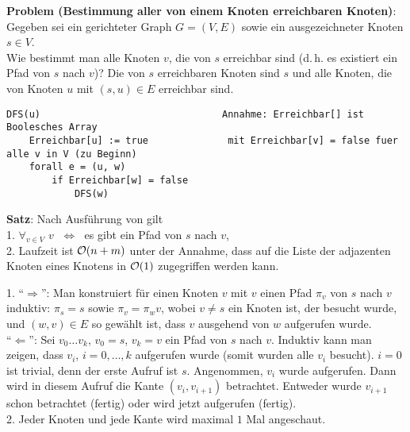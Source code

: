 \textbf{Problem (Bestimmung aller von einem Knoten erreichbaren Knoten)}: \\
Gegeben sei ein gerichteter Graph $G = (V, E)$ sowie ein ausgezeichneter Knoten
$s \in V$. \\
Wie bestimmt man alle Knoten $v$, die von $s$ erreichbar sind
(d.\,h. es existiert ein Pfad von $s$ nach $v$)?
Die von $s$ erreichbaren Knoten sind $s$ und alle Knoten, die von
Knoten $u$ mit $(s, u) \in E$ erreichbar sind.

\begin{lstlisting}
DFS(u)                                Annahme: Erreichbar[] ist Boolesches Array
    Erreichbar[u] := true              mit Erreichbar[v] = false fuer alle v in V (zu Beginn)
    forall e = (u, w)
        if Erreichbar[w] = false
            DFS(w)
\end{lstlisting}

\textbf{Satz}: Nach Ausführung von  gilt \\
1. $\forall_{v \in V}$ \code{Erreichbar[}$v$\code{] = true}
$\;\Leftrightarrow\;$ es gibt ein Pfad von $s$ nach $v$, \\
2. Laufzeit ist $\mathcal{O}(n + m)$ unter der Annahme, dass auf die Liste der
adjazenten Knoten eines Knotens in $\mathcal{O}(1)$ zugegriffen werden kann.

\begin{Beweis}
    1. "`$\Rightarrow$"':
    Man konstruiert für einen Knoten $v$ mit
    \code{Erreichbar[}$v$\code{] = true}
    einen Pfad $\pi_v$ von $s$ nach $v$ induktiv:
    $\pi_s = s$ sowie $\pi_v = \pi_w v$, wobei $v \not= s$ ein Knoten ist,
    der besucht wurde, und $(w, v) \in E$ so gewählt ist, dass
    $v$\code{)} ausgehend von $w$\code{)} aufgerufen
    wurde. \\
    "`$\Leftarrow$"':
    Sei $v_0 \dotsc v_k$, $v_0 = s$, $v_k = v$ ein Pfad von $s$ nach $v$.
    Induktiv kann man zeigen, dass $v_i$\code{)}, $i = 0, \dotsc, k$
    aufgerufen wurde (somit wurden alle $v_i$ besucht).
    $i = 0$ ist trivial, denn der erste Aufruf ist $s$\code{)}.
    Angenommen, $v_i$\code{)} wurde aufgerufen.
    Dann wird in diesem Aufruf die Kante $(v_i, v_{i+1})$ betrachtet.
    Entweder wurde $v_{i+1}$ schon betrachtet (fertig) oder wird jetzt
    aufgerufen (fertig). \\
    2. Jeder Knoten und jede Kante wird maximal $1$ Mal angeschaut.
\end{Beweis}

\linie

